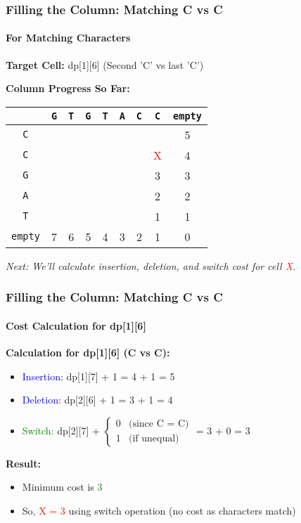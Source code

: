 \documentclass[10pt,aspectratio=43]{beamer}
\begin{document}
\begin{frame}
\frametitle{Filling the Column: Matching C vs C}
\framesubtitle{For Matching Characters}

\textbf{Target Cell:} dp[1][6] (Second 'C' vs last 'C')

\vspace{0.3cm}
\textbf{Column Progress So Far:}
\begin{center}
\scriptsize
\begin{tabular}{|c|c|c|c|c|c|c|c|c|}
    \hline
    & \texttt{G} & \texttt{T} & \texttt{G} & \texttt{T} & \texttt{A} & \texttt{C} & \texttt{C} & \texttt{empty} \\ \hline
    \texttt{C} &  &  &  &  &  &  &  & 5 \\ \hline
    \texttt{C} &  &  &  &  &  &  & \textcolor{red}{X} & 4 \\ \hline
    \texttt{G} &  &  &  &  &  &  & 3 & 3 \\ \hline
    \texttt{A} &  &  &  &  &  &  & 2 & 2 \\ \hline
    \texttt{T} &  &  &  &  &  &  & 1 & 1 \\ \hline
    \texttt{empty} & 7 & 6 & 5 & 4 & 3 & 2 & 1 & 0 \\ \hline
\end{tabular}
\end{center}

\vspace{0.3cm}
\begin{center}
\textit{Next: We’ll calculate insertion, deletion, and switch cost for cell \textcolor{red}{X}.}
\end{center}
\end{frame}


\begin{frame}
\frametitle{Filling the Column: Matching C vs C}
\framesubtitle{Cost Calculation for dp[1][6]}

\textbf{Calculation for dp[1][6] (C vs C):}
\begin{itemize}
    \item \textcolor{blue}{Insertion:} dp[1][7] + 1 = 4 + 1 = 5
    \item \textcolor{blue}{Deletion:} dp[2][6] + 1 = 3 + 1 = 4
    \item \textcolor{green}{Switch:} dp[2][7] + 
    $\begin{cases} 
        0 & \text{(since C = C)} \\
        1 & \text{(if unequal)}
    \end{cases}$ = 3 + 0 = 3
\end{itemize}

\vspace{0.3cm}
\textbf{Result:}
\begin{itemize}
    \item Minimum cost is \textcolor{green}{3}
    \item So, \textcolor{red}{X = 3} using switch operation (no cost as characters match)
\end{itemize}
\end{frame}
\end{document}
